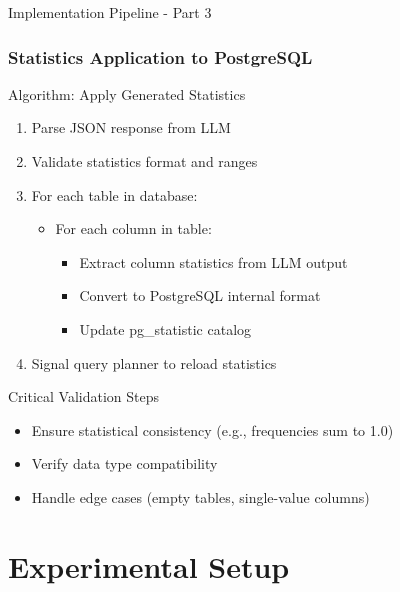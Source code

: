 \documentclass[smaller]{beamer}
\begin{document}
\begin{frame}{Implementation Pipeline - Part 3}
\frametitle{Statistics Application to PostgreSQL}

\begin{block}{Algorithm: Apply Generated Statistics}
\begin{enumerate}
\item Parse JSON response from LLM
\item Validate statistics format and ranges
\item For each table in database:
    \begin{itemize}
    \item For each column in table:
        \begin{itemize}
        \item Extract column statistics from LLM output
        \item Convert to PostgreSQL internal format
        \item Update pg\_statistic catalog
        \end{itemize}
    \end{itemize}
\item Signal query planner to reload statistics
\end{enumerate}
\end{block}

\begin{alertblock}{Critical Validation Steps}
\begin{itemize}
    \item Ensure statistical consistency (e.g., frequencies sum to 1.0)
    \item Verify data type compatibility
    \item Handle edge cases (empty tables, single-value columns)
\end{itemize}
\end{alertblock}

\end{frame}

\section{Experimental Setup}
\end{document}
